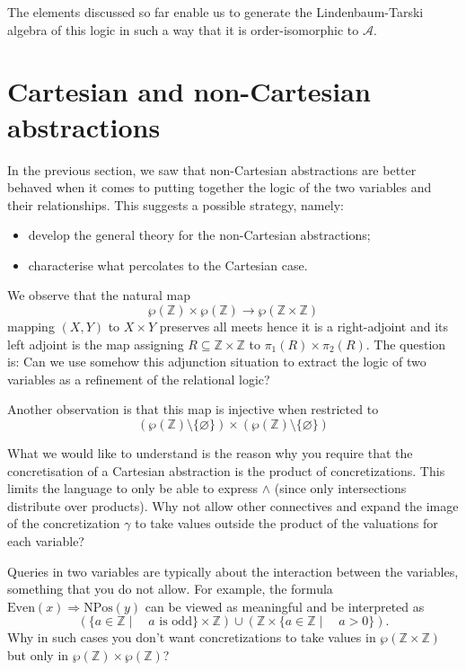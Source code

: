 \documentclass[11pt]{article}
\theoremstyle{plain}
\theoremstyle{definition}
\begin{document}
 The elements discussed so far  enable us to  generate the Lindenbaum-Tarski algebra of this logic in such a way that it is order-isomorphic to $\mathcal{A}$.


\section{Cartesian and non-Cartesian abstractions}

In the previous section, we saw that non-Cartesian abstractions are better behaved when it comes to putting  together the logic of the two variables and their relationships. This suggests a possible strategy, namely:
\begin{itemize}
	\item develop the general theory for the non-Cartesian abstractions;
	\item characterise what percolates to the Cartesian case.
\end{itemize}
We observe that the natural map $$\wp(\mathbb{Z})\times\wp(\mathbb{Z})\rightarrow\wp(\mathbb{Z}\times\mathbb{Z})$$ mapping $(X,Y)$ to $X\times Y$ preserves all meets hence it is a right-adjoint and its left adjoint is the map assigning $R\subseteq\mathbb{Z}\times\mathbb{Z}$ to $\pi_1(R)\times\pi_2(R)$. The question is: Can we use somehow this adjunction situation to extract the logic of two variables as a refinement of the relational logic?

Another observation is that this map is injective when restricted to $$(\wp(\mathbb{Z})\setminus\{\varnothing\})\times(\wp(\mathbb{Z})\setminus\{\varnothing\})$$

\iffalse

What we would like to understand is the reason why you require that the concretisation of a Cartesian abstraction is the product of concretizations. This  limits the language to only be able to express $\land$ (since only intersections distribute over products). Why not allow other connectives and expand the image of the concretization $\gamma$ to take values outside the product of the valuations for each variable?

Queries in two variables are typically about the interaction between the variables, something that you do not allow. For example,  the formula $\text{Even}(x)\Rightarrow\text{NPos}(y)$ can be viewed as meaningful and be interpreted as $$(\{a\in\mathbb{Z}\mid\quad a\text{ is odd}\}\times\mathbb{Z})\cup(\mathbb{Z}\times\{a\in\mathbb{Z}\mid\quad a>0\}).$$ Why in such cases you don't want concretizations to take values in $\wp(\mathbb{Z}\times\mathbb{Z})$ but only in $\wp(\mathbb{Z})\times\wp(\mathbb{Z})$?
\end{document}
